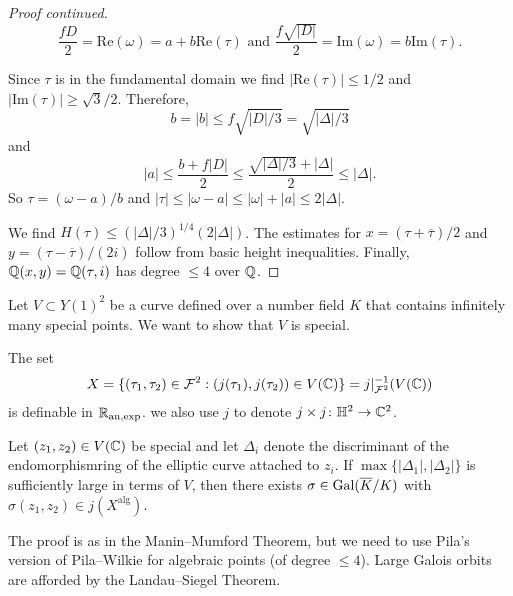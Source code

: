 \documentclass{beamer}
\begin{document}
\begin{frame}
  \begin{proof}[Proof continued]       
    $$\frac{fD}{2}=\mathrm{Re}(\omega) =
    a+b\mathrm{Re}(\tau)\text{ and }\frac{f\sqrt{|D|}}{2}=\mathrm{Im}(\omega)
    = b \mathrm{Im}(\tau).$$
    
Since $\tau$ is in the fundamental domain we
    find $|\mathrm{Re}(\tau)|\le 1/2$ and $|\mathrm{Im}(\tau)|\ge
    \sqrt{3}/2$. Therefore,
    \begin{equation*}
      b=|b|\le {f \sqrt{|D|/3}} = \sqrt{|\Delta|/3}
    \end{equation*}
    and
    \begin{equation*}
    |a|\le \frac{b+f|D|}{2} \le \frac{\sqrt{|\Delta|/3} +
        |\Delta|}{2} \le |\Delta|. 
    \end{equation*}
    So
    $\tau = (\omega-a)/b$ and $|\tau|\le
    |\omega-a|\le|\omega|+|a| \le 2|\Delta| $.

    We find $H(\tau) \le (|\Delta|/3)^{1/4} (2|\Delta|)$.
    The estimates for $x=(\tau+\overline\tau)/2$ and $y=(\tau-\overline\tau)/(2i)$ follow from basic height
    inequalities. Finally, ${\mathbb{Q}}(x,y) ={\mathbb{Q}}(\tau,i)$ has degree $\le 4$
    over ${\mathbb{Q}}$. 
  \end{proof}
\end{frame}

\begin{frame}
  Let $V\subset Y(1)^2$ be a curve defined over a number field $K$
  that contains infinitely many special points.
  We want to show that $V$ is special.
  
  The set
  \begin{equation}
    \label{def:Xao}
    X = \{(\tau_1,\tau_2) \in {\mathcal F}^2 : (j(\tau_1),j(\tau_2)) \in V({\mathbb{C}}) \} =
    j|_{{\mathcal F}^2}^{-1}(V({\mathbb{C}}))
  \end{equation}
  is \alert{definable} in ${{\mathbb{R}}_{\mathrm{an,exp}}}$.
  we also use $j$ to denote $j\times j\colon
  {\mathbb{H}}^2\rightarrow{\mathbb{C}}^2$.

  
  \begin{lemma}
    Let $(z_1,z_2)\in V({\mathbb{C}})$ be special and let $\Delta_i$ denote the discriminant
    of the endomorphismring of the elliptic curve attached to $z_i$.
    If $\max\{|\Delta_1|,|\Delta_2|\}$ is sufficiently large in terms of
    $V$, then there exists $\sigma\in \mathrm{Gal}(\overline{K}/K)$ with
    $\sigma(z_1,z_2)\in j(X^{\mathrm{alg}})$.   
  \end{lemma}

  The proof is as in the Manin--Mumford Theorem, but we need to use
  Pila's version of Pila--Wilkie for algebraic points (of degree $\le
  4$).
  Large Galois orbits are afforded by the \alert{Landau--Siegel} Theorem.
\end{frame}
\end{document}
